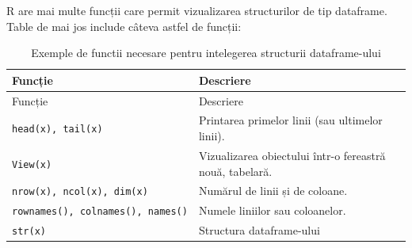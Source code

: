 \documentclass[]{article}
\begin{document}
R are mai multe funcții care permit vizualizarea structurilor de tip
dataframe. Table de mai jos include câteva astfel de funcții:

\begin{longtable}[]{@{}ll@{}}
\caption{Exemple de functii necesare pentru intelegerea structurii
dataframe-ului}\tabularnewline
\toprule
Funcție & Descriere\tabularnewline
\midrule
\endfirsthead
\toprule
Funcție & Descriere\tabularnewline
\midrule
\endhead
\texttt{head(x),\ tail(x)} & Printarea primelor linii (sau ultimelor
linii).\tabularnewline
\texttt{View(x)} & Vizualizarea obiectului într-o fereastră nouă,
tabelară.\tabularnewline
\texttt{nrow(x),\ ncol(x),\ dim(x)} & Numărul de linii și de
coloane.\tabularnewline
\texttt{rownames(),\ colnames(),\ names()} & Numele liniilor sau
coloanelor.\tabularnewline
\texttt{str(x)} & Structura dataframe-ului\tabularnewline
\bottomrule
\end{longtable}
\end{document}
